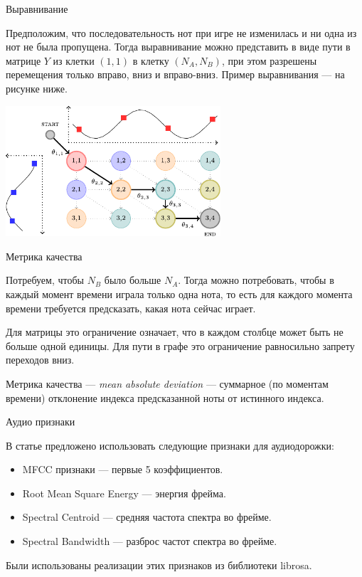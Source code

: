 \documentclass[unicode, dvipsnames]{beamer}
\begin{document}
\begin{frame}{Выравнивание}

Предположим, что последовательность нот при игре не изменилась и ни одна из нот не была пропущена. Тогда выравнивание можно представить в виде пути в матрице $Y$ из клетки $(1, 1)$ в клетку $(N_A, N_B)$, при этом разрешены перемещения только вправо, вниз и вправо-вниз. Пример выравнивания --- на рисунке ниже.

\bigskip
\centering
\includegraphics[width=0.6\textwidth]{graphics/align_example.pdf}

\end{frame}

\begin{frame}{Метрика качества}

Потребуем, чтобы $N_B$ было больше $N_A$. Тогда можно потребовать, чтобы в каждый момент времени играла только одна нота, то есть для каждого момента времени требуется предсказать, какая нота сейчас играет. 

\bigskip
Для матрицы это ограничение означает, что в каждом столбце может быть не больше одной единицы. Для пути в графе это ограничение равносильно запрету переходов вниз.

\bigskip
Метрика качества --- \textit{mean absolute deviation} --- суммарное (по моментам времени) отклонение индекса предсказанной ноты от истинного индекса.

\end{frame}

\begin{frame}{Аудио признаки}

В статье предложено использовать следующие признаки для аудиодорожки:

\bigskip
\begin{itemize}
	\item MFCC признаки --- первые 5 коэффициентов.
	\item Root Mean Square Energy --- энергия фрейма.
	\item Spectral Centroid --- средняя частота спектра во фрейме.
	\item Spectral Bandwidth --- разброс частот спектра во фрейме.
\end{itemize}

\bigskip
Были использованы реализации этих признаков из библиотеки librosa.

\end{frame}
\end{document}
